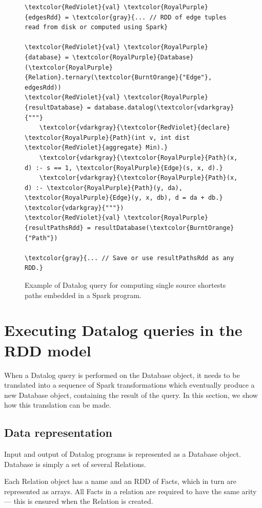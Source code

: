 \begin{figure}[h!]
  \centering
\begin{Verbatim}
\textcolor{RedViolet}{val} \textcolor{RoyalPurple}{edgesRdd} = \textcolor{gray}{... // RDD of edge tuples read from disk or computed using Spark}

\textcolor{RedViolet}{val} \textcolor{RoyalPurple}{database} = \textcolor{RoyalPurple}{Database}(\textcolor{RoyalPurple}{Relation}.ternary(\textcolor{BurntOrange}{"Edge"}, edgesRdd))
\textcolor{RedViolet}{val} \textcolor{RoyalPurple}{resultDatabase} = database.datalog(\textcolor{vdarkgray}{"""}
    \textcolor{vdarkgray}{\textcolor{RedViolet}{declare} \textcolor{RoyalPurple}{Path}(int v, int dist \textcolor{RedViolet}{aggregate} Min).}
    \textcolor{vdarkgray}{\textcolor{RoyalPurple}{Path}(x, d) :- s == 1, \textcolor{RoyalPurple}{Edge}(s, x, d).}
    \textcolor{vdarkgray}{\textcolor{RoyalPurple}{Path}(x, d) :- \textcolor{RoyalPurple}{Path}(y, da), \textcolor{RoyalPurple}{Edge}(y, x, db), d = da + db.}
\textcolor{vdarkgray}{"""})
\textcolor{RedViolet}{val} \textcolor{RoyalPurple}{resultPathsRdd} = resultDatabase(\textcolor{BurntOrange}{"Path"})

\textcolor{gray}{... // Save or use resultPathsRdd as any RDD.}
\end{Verbatim}
  \caption{Example of Datalog query for computing single source shortests paths embedded in a Spark program.\label{sdinspark}}
\end{figure}
\section{Executing Datalog queries in the RDD model}

When a Datalog query is performed on the Database object, it needs to be translated into a sequence of Spark transformations which eventually produce a new Database object, containing the result of the query. In this section, we show how this translation can be made.

\subsection{Data representation}

Input and output of Datalog programs is represented as a Database object. Database is simply a set of several Relations.

Each Relation object has a name and an RDD of Facts, which in turn are represented as arrays. All Facts in a relation are required to have the same arity --- this is ensured when the Relation is created.

